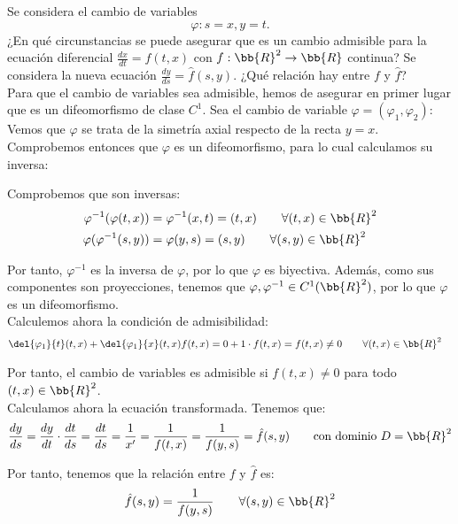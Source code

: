 \documentclass[12pt]{article}
\begin{document}
    \begin{ejercicio}
        Se considera el cambio de variables
        \begin{equation*}
            \varphi : s = x, y = t.
        \end{equation*}
        ¿En qué circunstancias se puede asegurar que es un cambio admisible para la ecuación diferencial $\frac{dx}{dt} = f(t, x)$ con $f : \bb{R}^2 \to \bb{R}$ continua?
        Se considera la nueva ecuación $\frac{dy}{ds} = \hat{f}(s, y)$. ¿Qué relación hay entre $f$ y $\hat{f}$?\\

        Para que el cambio de variables sea admisible, hemos de asegurar en primer lugar que es un difeomorfismo de clase $C^1$.
        Sea el cambio de variable $\varphi=(\varphi_1, \varphi_2)$:
        Vemos que $\varphi$ se trata de la simetría axial respecto de la recta $y=x$. Comprobemos entonces que $\varphi$ es un difeomorfismo, para lo cual calculamos su inversa:

        Comprobemos que son inversas:
        \begin{align*}
            \varphi^{-1}(\varphi(t,x)) &= \varphi^{-1}(x,t) = (t,x)\qquad \forall (t,x)\in\bb{R}^2\\
            \varphi(\varphi^{-1}(s,y)) &= \varphi(y,s) = (s,y) \qquad \forall (s,y)\in\bb{R}^2
        \end{align*}

        Por tanto, $\varphi^{-1}$ es la inversa de $\varphi$, por lo que $\varphi$ es biyectiva. Además, como sus componentes son proyecciones, tenemos que $\varphi, \varphi^{-1}\in C^1(\bb{R}^2)$, por lo que $\varphi$ es un difeomorfismo.\\

        Calculemos ahora la condición de admisibilidad:
        \begin{align*}
            \del{\varphi_1}{t}(t,x) + \del{\varphi_1}{x}(t,x)f(t,x) &= 0 + 1\cdot f(t,x) = f(t,x) \neq 0 \qquad \forall (t,x)\in\bb{R}^2
        \end{align*}

        Por tanto, el cambio de variables es admisible si $f(t,x)\neq 0$ para todo $(t,x)\in\bb{R}^2$.\\

        Calculamos ahora la ecuación transformada. Tenemos que:
        \begin{equation*}
            \frac{dy}{ds} = \frac{dy}{dt}\cdot\frac{dt}{ds} = \frac{dt}{ds} = \frac{1}{x'} = \dfrac{1}{f(t,x)} = \dfrac{1}{f(y,s)} = \hat{f}(s,y)
            \qquad \text{con dominio } D=\bb{R}^2
        \end{equation*}

        Por tanto, tenemos que la relación entre $f$ y $\hat{f}$ es:
        \begin{equation*}
            \hat{f}(s,y) = \frac{1}{f(y,s)} \qquad \forall (s,y)\in\bb{R}^2
        \end{equation*}
    \end{ejercicio}
\end{document}
